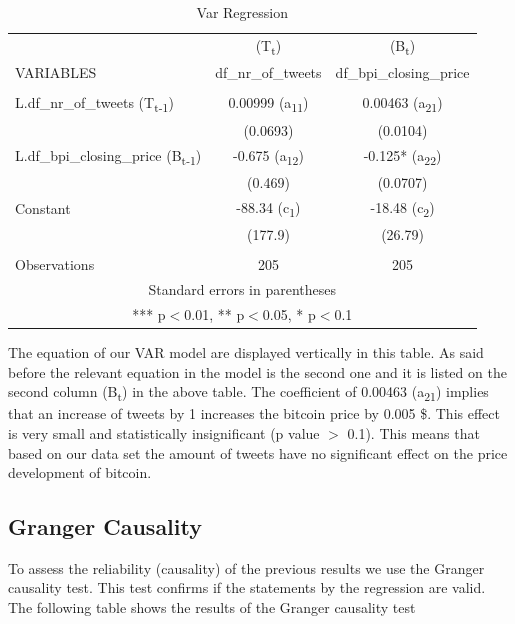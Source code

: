\documentclass[a4paper,american,12pt]{article}
\begin{document}
\begin{spacing}{1.2}
\begin{table}
\centering
	\begin{tabular}{lcc} \hline
	 & (T\textsubscript{t}) & (B\textsubscript{t}) \\
	VARIABLES & df\_nr\_of\_tweets & df\_bpi\_closing\_price \\ \hline
	 &  &  \\
	L.df\_nr\_of\_tweets (T\textsubscript{t-1}) & 0.00999 (a\textsubscript{11}) & 0.00463 (a\textsubscript{21}) \\
	 & (0.0693) & (0.0104) \\
	L.df\_bpi\_closing\_price (B\textsubscript{t-1}) & -0.675 (a\textsubscript{12}) & -0.125* (a\textsubscript{22}) \\
	 & (0.469) & (0.0707) \\
	Constant  & -88.34 (c\textsubscript{1}) & -18.48 (c\textsubscript{2}) \\
	 & (177.9) & (26.79) \\
	 &  &  \\
	 Observations & 205 & 205 \\ \hline
	\multicolumn{3}{c}{ Standard errors in parentheses} \\
	\multicolumn{3}{c}{ *** p$<$0.01, ** p$<$0.05, * p$<$0.1} \\
	\end{tabular}
\caption{Var Regression}
\end{table}

The equation of our VAR model are displayed vertically in this table. As said before the relevant equation in the model is the second one and it is listed on the second column (B\textsubscript{t}) in the above table. The coefficient of 0.00463 (a\textsubscript{21}) implies that an increase of tweets by 1 increases the bitcoin price by 0.005 \$. This effect is very small and statistically insignificant (p value $>$ 0.1). This means that based on our data set the amount of tweets have no significant effect on the price development of bitcoin.
		
\subsection{Granger Causality}
To assess the reliability (causality) of the previous results we use the Granger causality test. This test confirms if the statements by the regression are valid. The following table shows the results of the Granger causality test\\


\end{spacing}
\end{document}
